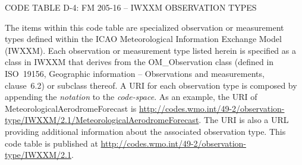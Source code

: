 CODE TABLE D-4: FM 205-16 -- IWXXM OBSERVATION TYPES

The items within this code table are specialized observation or measurement types defined within the ICAO Meteorological Information Exchange Model (IWXXM). Each observation or measurement type listed herein is specified as a class in IWXXM that derives from the OM\_Observation class (defined in ISO~19156, Geographic information -- Observations and measurements, clause~6.2) or subclass thereof. A URI for each observation type is composed by appending the \emph{notation} to the \emph{code-space}. As an example, the URI of MeteorologicalAerodromeForecast is \href{http://codes.wmo.int/49-2/observation-type/IWXXM/1.0/MeteorologicalAerodromeForecast}{http://codes.wmo.int/49-2/observation-type/IWXXM/2.1/MeteorologicalAerodromeForecast}. The URI is also a URL providing additional information about the associated observation type. This code table is published at \href{http://codes.wmo.int/49-2/observation-type/IWXXM/1.0}{http://codes.wmo.int/49-2/observation-type/IWXXM/2.1}.

